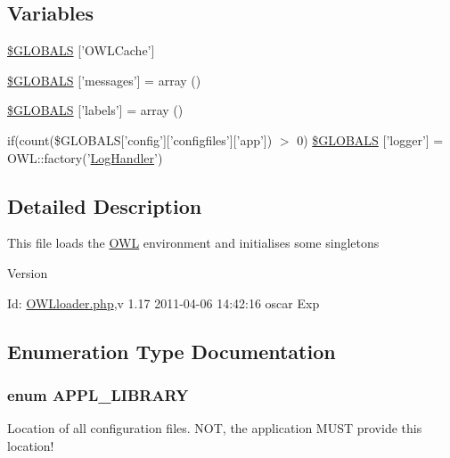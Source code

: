 \subsection*{Variables}
\begin{DoxyCompactItemize}
\item 
\hyperlink{OWLloader_8php_a79190ec221c2b52403f7324f1d224c8f}{\$GLOBALS} \mbox{[}'OWLCache'\mbox{]}
\item 
\hyperlink{OWLloader_8php_a65f2996116eed36e9ab25f254a470259}{\$GLOBALS} \mbox{[}'messages'\mbox{]} = array ()
\item 
\hyperlink{OWLloader_8php_a49e8feb96fae9cb6655df44ebad3ca2b}{\$GLOBALS} \mbox{[}'labels'\mbox{]} = array ()
\item 
if(count(\$GLOBALS\mbox{[}'config'\mbox{]}\mbox{[}'configfiles'\mbox{]}\mbox{[}'app'\mbox{]}) $>$ 0) \hyperlink{OWLloader_8php_a5657c6427a5b1e3d4450f366cddef80a}{\$GLOBALS} \mbox{[}'logger'\mbox{]} = OWL::factory('\hyperlink{classLogHandler}{LogHandler}')
\end{DoxyCompactItemize}


\subsection{Detailed Description}
This file loads the \hyperlink{classOWL}{OWL} environment and initialises some singletons \begin{DoxyVersion}{Version}

\end{DoxyVersion}
\begin{DoxyParagraph}{Id:}
\hyperlink{OWLloader_8php}{OWLloader.php},v 1.17 2011-\/04-\/06 14:42:16 oscar Exp 
\end{DoxyParagraph}


\subsection{Enumeration Type Documentation}
\subsubsection[{APPL\_\-LIBRARY}]{\setlength{\rightskip}{0pt plus 5cm}enum {\bf APPL\_\-LIBRARY}}\label{OWLloader_8php_a1b19bb6ffba1d1e7871092e086cc4e94}


Location of all configuration files. NOT, the application MUST provide this location! 

